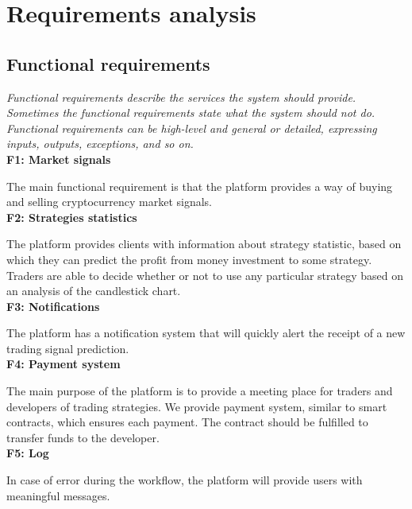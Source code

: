 \documentclass[thesis=B,english]{FITthesis}[2019/03/06]
\begin{document}
\section{Requirements analysis}

\subsection{Functional requirements}

\textit{Functional requirements describe the services the system should provide. Sometimes the functional requirements state what the system should not do. Functional requirements can be high-level and general or detailed, expressing inputs, outputs, exceptions, and so on.} \cite[p.~47--48]{laplante} \\

\noindent \textbf{F1: Market signals} \label{f:1}

\noindent The main functional requirement is that the platform provides a way of buying and selling cryptocurrency market signals. \\

\noindent \textbf{F2: Strategies statistics} \label{f:2}

\noindent The platform provides clients with information about strategy statistic, based on which they can predict the profit from money investment to some strategy. Traders are able to decide whether or not to use any particular strategy based on an analysis of the candlestick chart. \\

\noindent \textbf{F3: Notifications} \label{f:3}

\noindent The platform has a notification system that will quickly alert the receipt of a new trading
signal prediction.\\

\noindent \textbf{F4: Payment system} \label{f:4}

\noindent The main purpose of the platform is to provide a meeting place for traders and developers of trading strategies. We provide payment system, similar to smart contracts, which ensures each payment. The contract should be fulfilled to transfer funds to the developer. \\

\noindent \textbf{F5: Log} \label{f:5}

\noindent In case of error during the workflow, the platform will provide users with meaningful messages. \\
\end{document}
